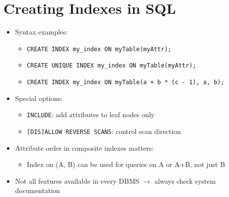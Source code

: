 \section{Creating Indexes in SQL}
\begin{itemize}
	\item Syntax examples:
	\begin{itemize}
		\item \texttt{CREATE INDEX my\_index ON myTable(myAttr);}
		\item \texttt{CREATE UNIQUE INDEX my\_index ON myTable(myAttr);}
		\item \texttt{CREATE INDEX my\_index ON myTable(a + b * (c - 1), a, b);}
	\end{itemize}
	\item Special options:
	\begin{itemize}
		\item \texttt{INCLUDE}: add attributes to leaf nodes only
		\item \texttt{[DIS]ALLOW REVERSE SCANS}: control scan direction
	\end{itemize}
	\item Attribute order in composite indexes matters:
	\begin{itemize}
		\item Index on (A, B) can be used for queries on A or A+B, not just B
	\end{itemize}
	\item Not all features available in every DBMS $\rightarrow$ always check system documentation
\end{itemize}

